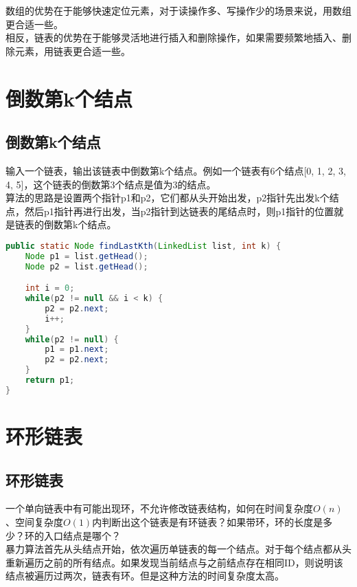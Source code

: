 数组的优势在于能够快速定位元素，对于读操作多、写操作少的场景来说，用数组更合适一些。\\

相反，链表的优势在于能够灵活地进行插入和删除操作，如果需要频繁地插入、删除元素，用链表更合适一些。

\newpage

\section{倒数第k个结点}

\subsection{倒数第k个结点}

输入一个链表，输出该链表中倒数第k个结点。例如一个链表有6个结点[0, 1, 2, 3, 4, 5]，这个链表的倒数第3个结点是值为3的结点。\\

算法的思路是设置两个指针p1和p2，它们都从头开始出发，p2指针先出发k个结点，然后p1指针再进行出发，当p2指针到达链表的尾结点时，则p1指针的位置就是链表的倒数第k个结点。\\


\begin{lstlisting}[language=Java]
public static Node findLastKth(LinkedList list, int k) {
    Node p1 = list.getHead();
    Node p2 = list.getHead();

    int i = 0;
    while(p2 != null && i < k) {
        p2 = p2.next;
        i++;
    }
    while(p2 != null) {
        p1 = p1.next;
        p2 = p2.next;
    }
    return p1;
}
\end{lstlisting}

\newpage

\section{环形链表}

\subsection{环形链表}

一个单向链表中有可能出现环，不允许修改链表结构，如何在时间复杂度$ O(n) $、空间复杂度$ O(1) $内判断出这个链表是有环链表？如果带环，环的长度是多少？环的入口结点是哪个？\\

暴力算法首先从头结点开始，依次遍历单链表的每一个结点。对于每个结点都从头重新遍历之前的所有结点。如果发现当前结点与之前结点存在相同ID，则说明该结点被遍历过两次，链表有环。但是这种方法的时间复杂度太高。\\

